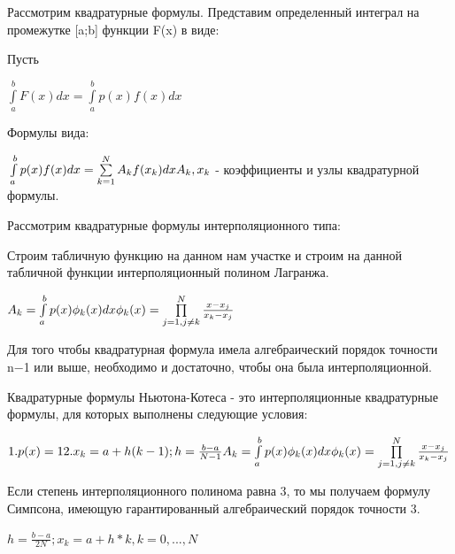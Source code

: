Рассмотрим квадратурные формулы. Представим определенный интеграл на промежутке [a;b] функции F(x) в виде:


Пусть 

\begin{math} 
	\int\limits_{a}^{b}F(x)dx=\int\limits_{a}^{b}p(x)f(x)dx
\end{math}

Формулы вида:

\begin{math} 
	\\
	\int\limits_{a}^{b}p(x)f(x)dx=\sum\limits_{k=1}^{N}A_{k}f(x_{k})dx \\
	A_{k} , x_{k}
\end{math}
- коэффициенты и узлы квадратурной формулы. 

Рассмотрим квадратурные формулы интерполяционного типа: 

Строим табличную функцию на данном нам участке и строим на данной табличной функции интерполяционный полином Лагранжа.

\begin{math} 
	\\
	A_{k}=\int\limits_{a}^{b}p(x)\phi_{k}(x)dx \\
	\phi_{k}(x)=\prod\limits_{j=1,j\neq k}^{N}\frac{x-x_{j}}{x_{k}-x_{j}}
\end{math}

Для того чтобы квадратурная формула имела алгебраический порядок точности n−1 или выше, необходимо и достаточно, чтобы она была интерполяционной.

Квадратурные формулы Ньютона-Котеса - это интерполяционные квадратурные формулы, для которых выполнены следующие условия: 

\begin{math} 
	\\
	1. p(x)=1 \\
	2. x_{k}=a+h(k-1); h=\frac{b-a}{N-1} \\
		\\
	A_{k}=\int\limits_{a}^{b}p(x)\phi_{k}(x)dx \\
	\phi_{k}(x)=\prod\limits_{j=1,j\neq k}^{N}\frac{x-x_{j}}{x_{k}-x_{j}}
\end{math}

Если степень интерполяционного полинома равна 3, то мы получаем формулу Симпсона, имеющую гарантированный алгебраический порядок точности 3. 

\begin{math} 
	h=\frac{b-a}{2N}; x_{k}=a+h*k, k=0,...,N
\end{math}

